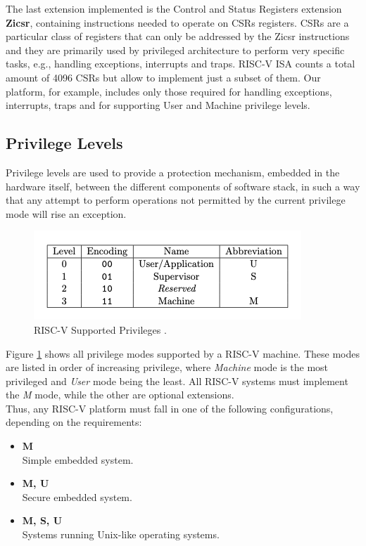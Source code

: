 The last extension implemented is the Control and Status Registers extension \textbf{Zicsr}, containing instructions needed to operate on CSRs registers. CSRs are a particular class of registers that can only be addressed by the Zicsr instructions and they are primarily used by privileged architecture to perform very specific tasks, e.g., handling exceptions, interrupts and traps. RISC-V ISA counts a total amount of 4096 CSRs but allow to implement just a subset of them. Our platform, for example, includes only those required for handling exceptions, interrupts, traps and for supporting User and Machine privilege levels.

\subsection{Privilege Levels}
Privilege levels are used to provide a protection mechanism, embedded in the hardware itself, between the different components of software stack, in such a way that any attempt to perform operations not permitted by the current privilege mode will rise an exception.
\begin{figure}[h!]
\centering
\vspace{0.5cm}
\includegraphics[scale=0.9]{./images/rvprivileges}
\caption{RISC-V Supported Privileges \cite{riscvII}.}
\label{fig:rvpri} %
\end{figure}
Figure \ref{fig:rvpri} shows all privilege modes supported by a RISC-V machine. These modes are listed in order of increasing privilege, where \emph{Machine} mode is the most privileged and \emph{User} mode being the least. All RISC-V systems must implement the \emph{M} mode, while the other are optional extensions.\\Thus, any RISC-V platform must fall in one of the following configurations, depending on the requirements:
\begin{itemize}
\item \textbf{M} \\ Simple embedded system.
\item \textbf{M, U} \\ Secure embedded system.
\item \textbf{M, S, U} \\ Systems running Unix-like operating systems.
\end{itemize}
